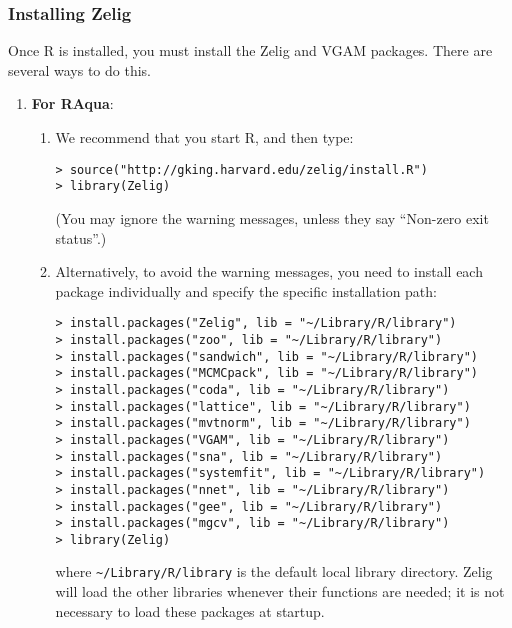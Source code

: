 \documentclass{article}
\begin{document}
\subsubsection{Installing Zelig}\label{osx.manual}

Once R is installed, you must install the Zelig and VGAM packages.
There are several ways to do this.
\begin{enumerate}
\item {\bf For RAqua}:
  \begin{enumerate}
    
  \item We recommend that you start R, and then type:
\begin{verbatim}
> source("http://gking.harvard.edu/zelig/install.R")
> library(Zelig)
\end{verbatim}
(You may ignore the warning messages, unless they say ``Non-zero exit 
status''.)
\item Alternatively, to avoid the warning messages, you need to install 
each package individually and specify the specific installation path:
\begin{verbatim}
> install.packages("Zelig", lib = "~/Library/R/library")
> install.packages("zoo", lib = "~/Library/R/library")
> install.packages("sandwich", lib = "~/Library/R/library")
> install.packages("MCMCpack", lib = "~/Library/R/library")
> install.packages("coda", lib = "~/Library/R/library")
> install.packages("lattice", lib = "~/Library/R/library")
> install.packages("mvtnorm", lib = "~/Library/R/library")
> install.packages("VGAM", lib = "~/Library/R/library")
> install.packages("sna", lib = "~/Library/R/library")
> install.packages("systemfit", lib = "~/Library/R/library")
> install.packages("nnet", lib = "~/Library/R/library")
> install.packages("gee", lib = "~/Library/R/library")
> install.packages("mgcv", lib = "~/Library/R/library")
> library(Zelig)
\end{verbatim}
    where \texttt{\~{}/Library/R/library} is the default local library
    directory. Zelig will load the other libraries whenever their functions
    are needed; it is not necessary to load these packages at startup.
    

\end{enumerate}
\end{enumerate}
\end{document}
